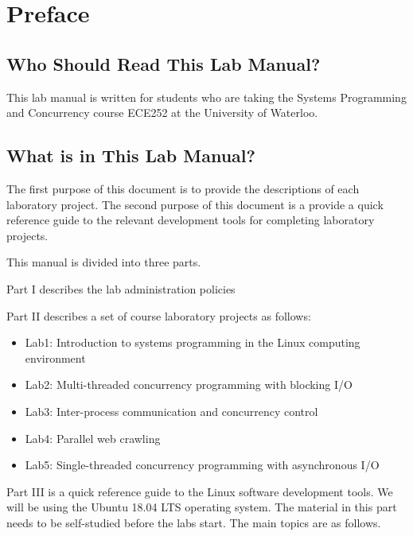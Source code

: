 \frontmatter 



\chapter{Preface}

\section*{Who Should Read This Lab Manual?}
This lab manual is written for students who are taking the Systems Programming and Concurrency course ECE252 at the University of Waterloo.

\section*{What is in This Lab Manual?}

The first purpose of this document is to provide the descriptions of each laboratory project.
The second purpose of this document is a provide a quick reference guide to the relevant development tools 
for completing laboratory projects.

This manual is divided into three parts. 

Part I describes the lab administration policies 

Part II describes a set of course laboratory projects as follows:

\begin{itemize}
    \item Lab1: Introduction to systems programming in the Linux computing environment
    \item Lab2: Multi-threaded concurrency programming with blocking I/O
    \item Lab3: Inter-process communication and concurrency control
    \item Lab4: Parallel web crawling
    \item Lab5: Single-threaded concurrency programming with asynchronous I/O  
\end{itemize}

Part III is a quick reference guide to the Linux software development tools. We will be using the Ubuntu 18.04 LTS operating system. The material in this part needs to be self-studied before the labs start.
The main topics are as follows.

